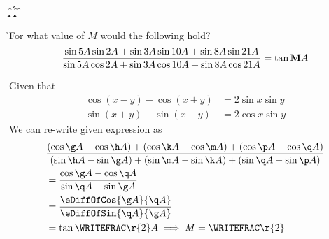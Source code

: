 

\MAX\vbone\vbtwo\a
\MIN\vbone\vbtwo\b
\MAX\vbthree\vbfour\c
\MIN\vbthree\vbfour\d
\MAX\vbfive\vbsix\e
\MIN\vbfive\vbsix\f

\SUBTRACT\a\b\g
\ADD\a\b\h
\SUBTRACT\c\d\k
\ADD\c\d\m
\SUBTRACT\e\f\p
\ADD\e\f\q

\ADD\q\g\r

\question[4] For what value of $M$ would the following hold?
\[ \dfrac{\sin5 A\sin2 A + \sin3 A\sin10 A + \sin8 A\sin21 A}
{\sin5 A\cos2 A + \sin3 A\cos10 A + \sin8 A\cos21 A} = \tan\textbf{M}A\]

\begin{explanation}[\fullpage]
  Given that 
  \begin{align}
    \cos(x-y)-\cos(x+y) &= 2\sin x\sin y \\
    \sin(x+y) - \sin(x-y) &= 2\cos x\sin y
  \end{align}
  We can re-write given expression as 
  \begin{align}
    &\dfrac{(\cos\g A - \cos\h A) + (\cos\k A - \cos\m A) + (\cos\p A - \cos\q A)}
    {(\sin\h A - \sin\g A) + (\sin\m A - \sin\k A) + (\sin\q A - \sin\p A)} \nonumber\\
    &= \dfrac{\cos\g A - \cos\q A}{\sin\q A - \sin\g A}  \\
    &= \dfrac{\eDiffOfCos{\g A}{\q A}}{\eDiffOfSin{\q A}{\g A}} \\
    &= \tan\WRITEFRAC\r{2} A \implies M = \WRITEFRAC\r{2}
  \end{align}
\end{explanation}

